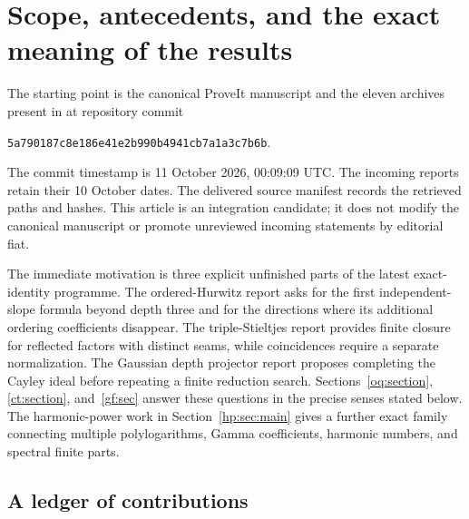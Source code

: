 \section{Scope, antecedents, and the exact meaning of the results}
\label{scope:section}

The starting point is the canonical ProveIt manuscript
\cite{RepoMain} and the eleven archives present in 
at repository commit
\begin{center}
\texttt{5a790187c8e186e41e2b990b4941cb7a1a3c7b6b}.
\end{center}
The commit timestamp is 11 October 2026, 00:09:09 UTC. The incoming
reports retain their 10 October dates. The delivered source manifest
records the retrieved paths and hashes. This article is an integration
candidate; it does not modify the canonical manuscript or promote
unreviewed incoming statements by editorial fiat.

The immediate motivation is three explicit unfinished parts of the
latest exact-identity programme. The ordered-Hurwitz report
\cite{RepoOrdered} asks for the first independent-slope formula beyond
depth three and for the directions where its additional ordering
coefficients disappear. The triple-Stieltjes report \cite{RepoTriple}
provides finite closure for reflected factors with distinct seams, while
coincidences require a separate normalization. The Gaussian depth
projector report \cite{gf:Depth} proposes completing the Cayley ideal
before repeating a finite reduction search. Sections~\ref{oq:section},
\ref{ct:section}, and~\ref{gf:sec} answer these questions in the
precise senses stated below. The harmonic-power work in
Section~\ref{hp:sec:main} gives a further exact family connecting
multiple polylogarithms, Gamma coefficients, harmonic numbers, and
spectral finite parts.

\subsection{A ledger of contributions}

